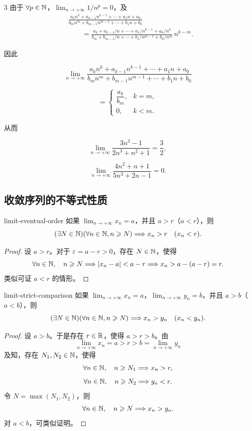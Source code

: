 \begin{sourceexample}{3}
由于 \(\forall p\in\mathbb{N}\)，\(\lim_{n\to+\infty}1/n^p=0\)，及
\[
\begin{aligned}
&\frac{a_k n^k+a_{k-1}n^{k-1}+\cdots+a_1n+a_0}
       {b_m n^m+b_{m-1}n^{m-1}+\cdots+b_1n+b_0}\\
&\qquad=
\frac{a_k+a_{k-1}/n+\cdots+a_1/n^{k-1}+a_0/n^k}
     {b_m+b_{m-1}/n+\cdots+b_1/n^{m-1}+b_0/n^m}\,n^{k-m}.
\end{aligned}
\]

因此

\[\lim_{n \to +\infty} \frac{a_k n^k + a_{k-1} n^{k-1} + \cdots + a_1 n + a_0}{b_m n^m + b_{m-1} n^{m-1} + \cdots + b_1 n + b_0}\]

\[= \begin{cases} \dfrac{a_k}{b_m}, & k=m, \\ 0, & k<m. \end{cases}\]

从而

\[\lim_{n\to+\infty} \frac{3n^3-1}{2n^3+n^2+1} = \frac{3}{2},\]

\[\lim_{n\to+\infty} \frac{4n^2+n+1}{5n^3+2n-1} = 0.\]
\end{sourceexample}

\subsection{收敛序列的不等式性质}

\begin{myproperty}{}{limit-eventual-order}
如果 \(\lim_{n\to+\infty}x_n=a\)，并且 \(a>r\)（\(a<r\)），则
\[
(\exists N\in\mathbb{N})(\forall n\in\mathbb{N}, n\geqslant N)
\Longrightarrow x_n>r\quad(x_n<r).
\]
\end{myproperty}

\begin{proof}
设 \(a>r\)。对于 \(\varepsilon=a-r>0\)，存在 \(N\in\mathbb{N}\)，使得
\[
\forall n\in\mathbb{N},\quad n\geqslant N\Longrightarrow |x_n-a|<a-r
\Longrightarrow x_n>a-(a-r)=r.
\]
类似可证 \(a<r\) 的情形。
\end{proof}

\begin{myproperty}{}{limit-strict-comparison}
如果 \(\lim_{n\to+\infty}x_n=a\)，\(\lim_{n\to+\infty}y_n=b\)，并且 \(a>b\)（\(a<b\)），则
\[
(\exists N\in\mathbb{N})(\forall n\in\mathbb{N}, n\geqslant N)
\Longrightarrow x_n>y_n\quad(x_n<y_n).
\]
\end{myproperty}

\begin{proof}
设 \(a>b\)。于是存在 \(r\in\mathbb{R}\)，使得 \(a>r>b\)。由
\[
\lim_{n\to+\infty}x_n=a>r>b=\lim_{n\to+\infty}y_n
\]
及知，存在 \(N_1,N_2\in\mathbb{N}\)，使得
\[
\forall n\in\mathbb{N},\quad n\geqslant N_1\Longrightarrow x_n>r,
\]
\[
\forall n\in\mathbb{N},\quad n\geqslant N_2\Longrightarrow y_n<r.
\]
令 \(N=\max(N_1,N_2)\)，则
\[
\forall n\in\mathbb{N},\quad n\geqslant N\Longrightarrow x_n>y_n.
\]
对 \(a<b\)，可类似证明。
\end{proof}

